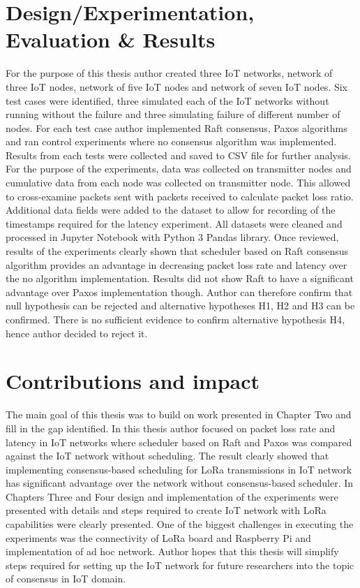 \documentclass[oneside,12pt]{book}
\begin{document}
\section{Design/Experimentation, Evaluation \& Results}
For the purpose of this thesis author created three IoT networks, network of three IoT nodes, network of five IoT nodes and network of seven IoT nodes. Six test cases were identified, three simulated each of the IoT networks without running without the failure and three simulating failure of different number of nodes. For each test case author implemented Raft consensus, Paxos algorithms and ran control experiments where no consensus algorithm was implemented. Results from each tests were collected and saved to CSV file for further analysis. 
For the purpose of the experiments, data was collected on transmitter nodes and cumulative data from each node was collected on transmitter node. This allowed to cross-examine packets sent with packets received to calculate packet loss ratio. Additional data fields were added to the dataset to allow for recording of the timestamps required for the latency experiment. All datasets were cleaned and processed in Jupyter Notebook with Python 3 Pandas library.
Once reviewed, results of the experiments clearly shown that scheduler based on Raft consensus algorithm provides an advantage in decreasing packet loss rate and latency over the no algorithm implementation. Results did not show Raft to have a significant advantage over Paxos implementation though. Author can therefore confirm that null hypothesis can be rejected and alternative hypotheses H1, H2 and H3 can be confirmed. There is no sufficient evidence to confirm alternative hypothesis H4, hence author decided to reject it.
\section{Contributions and impact}
The main goal of this thesis was to build on work presented in Chapter Two and fill in the gap identified. In this thesis author focused on packet loss rate and latency in IoT networks where scheduler based on Raft and Paxos was compared against the IoT network without scheduling. The result clearly showed that implementing consensus-based scheduling for LoRa transmissions in IoT network has significant advantage over the network without consensus-based scheduler. In Chapters Three and Four design and implementation of the experiments were presented with details and steps required to create IoT network with LoRa capabilities were clearly presented. One of the biggest challenges in executing the experiments was the connectivity of LoRa board and Raspberry Pi and implementation of ad hoc network. Author hopes that this thesis will simplify steps required for setting up the IoT network for future researchers into the topic of consensus in IoT domain. 
\end{document}

